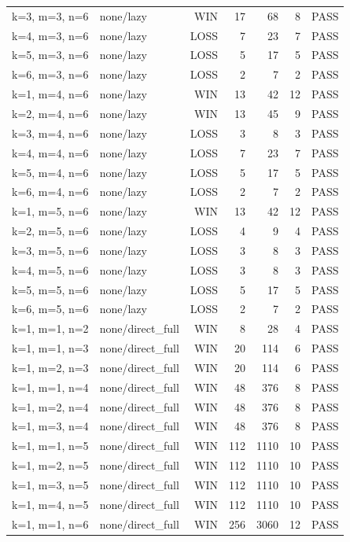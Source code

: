 \begin{longtable}{llrrrrl}
k=3, m=3, n=6 & none/lazy & WIN & 17 & 68 & 8 & PASS \\
k=4, m=3, n=6 & none/lazy & LOSS & 7 & 23 & 7 & PASS \\
k=5, m=3, n=6 & none/lazy & LOSS & 5 & 17 & 5 & PASS \\
k=6, m=3, n=6 & none/lazy & LOSS & 2 & 7 & 2 & PASS \\
k=1, m=4, n=6 & none/lazy & WIN & 13 & 42 & 12 & PASS \\
k=2, m=4, n=6 & none/lazy & WIN & 13 & 45 & 9 & PASS \\
k=3, m=4, n=6 & none/lazy & LOSS & 3 & 8 & 3 & PASS \\
k=4, m=4, n=6 & none/lazy & LOSS & 7 & 23 & 7 & PASS \\
k=5, m=4, n=6 & none/lazy & LOSS & 5 & 17 & 5 & PASS \\
k=6, m=4, n=6 & none/lazy & LOSS & 2 & 7 & 2 & PASS \\
k=1, m=5, n=6 & none/lazy & WIN & 13 & 42 & 12 & PASS \\
k=2, m=5, n=6 & none/lazy & LOSS & 4 & 9 & 4 & PASS \\
k=3, m=5, n=6 & none/lazy & LOSS & 3 & 8 & 3 & PASS \\
k=4, m=5, n=6 & none/lazy & LOSS & 3 & 8 & 3 & PASS \\
k=5, m=5, n=6 & none/lazy & LOSS & 5 & 17 & 5 & PASS \\
k=6, m=5, n=6 & none/lazy & LOSS & 2 & 7 & 2 & PASS \\
k=1, m=1, n=2 & none/direct\_full & WIN & 8 & 28 & 4 & PASS \\
k=1, m=1, n=3 & none/direct\_full & WIN & 20 & 114 & 6 & PASS \\
k=1, m=2, n=3 & none/direct\_full & WIN & 20 & 114 & 6 & PASS \\
k=1, m=1, n=4 & none/direct\_full & WIN & 48 & 376 & 8 & PASS \\
k=1, m=2, n=4 & none/direct\_full & WIN & 48 & 376 & 8 & PASS \\
k=1, m=3, n=4 & none/direct\_full & WIN & 48 & 376 & 8 & PASS \\
k=1, m=1, n=5 & none/direct\_full & WIN & 112 & 1110 & 10 & PASS \\
k=1, m=2, n=5 & none/direct\_full & WIN & 112 & 1110 & 10 & PASS \\
k=1, m=3, n=5 & none/direct\_full & WIN & 112 & 1110 & 10 & PASS \\
k=1, m=4, n=5 & none/direct\_full & WIN & 112 & 1110 & 10 & PASS \\
k=1, m=1, n=6 & none/direct\_full & WIN & 256 & 3060 & 12 & PASS \\

\end{longtable}
